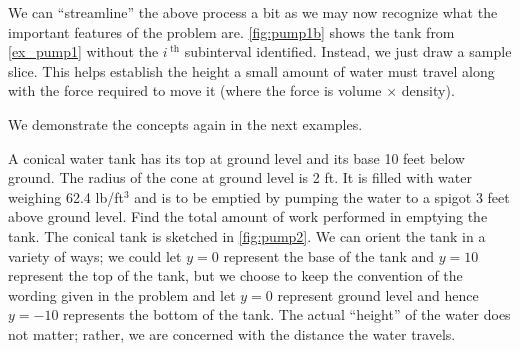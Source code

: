 We can ``streamline'' the above process a bit as we may now recognize what the important features of the problem are. \autoref{fig:pump1b} shows the tank from \autoref{ex_pump1} without the $i\,^\text{th}$ subinterval identified. Instead, we just draw a sample slice. This helps establish the height a small amount of water must travel along with the force required to move it (where the force is volume $\times$ density).

We demonstrate the concepts again in the next examples.

\begin{example}\label{ex_pump2}
A conical water tank has its top at ground level and its base 10 feet below ground. The radius of the cone at ground level is 2 ft. It is filled with water weighing 62.4 lb/ft$^3$ and is to be emptied by pumping the water to a spigot 3 feet above ground level. Find the total amount of work performed in emptying the tank.
\solution
The conical tank is sketched in \autoref{fig:pump2}. We can orient the tank in a variety of ways; we could let $y=0$ represent the base of the tank and $y=10$ represent the top of the tank, but we choose to keep the convention of the wording given in the problem and let $y=0$ represent ground level and hence $y=-10$ represents the bottom of the tank. The actual ``height'' of the water does not matter; rather, we are concerned with the distance the water travels. 



\end{example}
